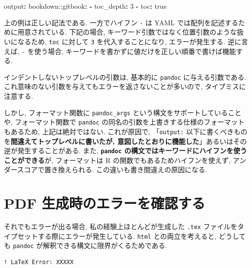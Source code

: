 \documentclass[
]{bxjsbook}
\newenvironment{Shaded}{\begin{snugshade}}{\end{snugshade}}
\newcommand{\AttributeTok}[1]{\textcolor[rgb]{0.77,0.63,0.00}{#1}}
\newcommand{\CharTok}[1]{\textcolor[rgb]{0.31,0.60,0.02}{#1}}
\newcommand{\DecValTok}[1]{\textcolor[rgb]{0.00,0.00,0.81}{#1}}
\newcommand{\FunctionTok}[1]{\textcolor[rgb]{0.00,0.00,0.00}{#1}}
\newcommand{\KeywordTok}[1]{\textcolor[rgb]{0.13,0.29,0.53}{\textbf{#1}}}
\theoremstyle{definition}
\theoremstyle{definition}
\theoremstyle{definition}
\theoremstyle{remark}
\begin{document}
\begin{Shaded}
\begin{Highlighting}[]
\FunctionTok{output}\KeywordTok{:}
\AttributeTok{  bookdown:}\FunctionTok{:gitbook}\KeywordTok{:}
\AttributeTok{    }\KeywordTok{{-}}\AttributeTok{ }\FunctionTok{toc\_depth}\KeywordTok{:}\AttributeTok{ }\DecValTok{3}
\AttributeTok{    }\KeywordTok{{-}}\AttributeTok{ }\FunctionTok{toc}\KeywordTok{:}\AttributeTok{ }\CharTok{true}
\end{Highlighting}
\end{Shaded}

上の例は正しい記法である. 一方でハイフン \texttt{-} は YAML
では配列を記述するために用意されている. 下記の場合,
キーワード引数ではなく位置引数のような扱いになるため, \texttt{toc}
に対して \texttt{3} を代入することになり, エラーが発生する. 逆に言えば,
\texttt{-} を使う場合,
キーワードを書かずに値だけを正しい順番で書けば機能する.

インデントしないトップレベルの引数は, 基本的に \texttt{pandoc}
に与える引数である.
これ意味のない引数を与えてもエラーを返さないことが多いので,
タイプミスに注意する.

しかし, フォーマット関数に \texttt{pandoc\_args}
という構文をサポートしていることや, フォーマット関数で \texttt{pandoc}
の同名の引数を上書きする仕様のフォーマットもあるため,
上記は絶対ではない. これが原因で, 「\texttt{output:}
以下に書くべきものを\textbf{間違えてトップレベルに書いたが,
意図したとおりに機能した}」あるいはその逆が発生することがある. また,
\textbf{\texttt{pandoc}
の構文ではキーワードにハイフンを使うことができる}が, フォーマットは R
の関数でもあるためハイフンを使えず, アンダースコアで置き換えられる.
この違いも書き間違えの原因になる.

\hypertarget{pdf-ux751fux6210ux6642ux306eux30a8ux30e9ux30fcux3092ux78baux8a8dux3059ux308b}{%
\section{PDF
生成時のエラーを確認する}\label{pdf-ux751fux6210ux6642ux306eux30a8ux30e9ux30fcux3092ux78baux8a8dux3059ux308b}}

それでもエラーが出る場合, 私の経験上ほとんどが生成した \texttt{.tex}
ファイルをタイプセットする際にエラーが発生している. \texttt{html}
との両立を考えると, どうしても \texttt{pandoc}
が解釈できる構文に限界がくるためである.

\begin{verbatim}
! LaTeX Error: XXXXX
\end{verbatim}
\end{document}
